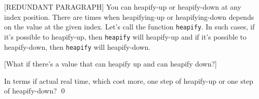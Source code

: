 [REDUNDANT PARAGRAPH]
You can heapify-up or heapify-down at any index position.
There are times when heapifying-up or heapifying-down depends on the
value at the given index.
Let's call the function \verb!heapify!.
In such cases, if it's possible to heapify-up, then \verb!heapify! will
heapify-up and if it's possible to heapify-down, then \verb!heapify!
will heapify-down.

[What if there's a value that can heapify up and can heapify down?]


\begin{ex}
  In terms if actual real time, which cost more, one step of
  heapify-up or one step of heapify-down?
  \qed
\end{ex}
